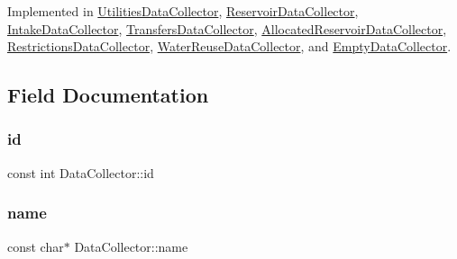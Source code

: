 Implemented in \mbox{\hyperlink{classUtilitiesDataCollector_ae502a096e8f4fdfdfd481ab2093f9771_ae502a096e8f4fdfdfd481ab2093f9771}{Utilities\+Data\+Collector}}, \mbox{\hyperlink{classReservoirDataCollector_ae2f8e808c5960608e510a64c7f00ad1b_ae2f8e808c5960608e510a64c7f00ad1b}{Reservoir\+Data\+Collector}}, \mbox{\hyperlink{classIntakeDataCollector_a2855eb8eed71649309bd4d9336f258c0_a2855eb8eed71649309bd4d9336f258c0}{Intake\+Data\+Collector}}, \mbox{\hyperlink{classTransfersDataCollector_ade6b896383f079d8973076e6b9a8053a_ade6b896383f079d8973076e6b9a8053a}{Transfers\+Data\+Collector}}, \mbox{\hyperlink{classAllocatedReservoirDataCollector_a30d8c59205862822f6548472ba62e537_a30d8c59205862822f6548472ba62e537}{Allocated\+Reservoir\+Data\+Collector}}, \mbox{\hyperlink{classRestrictionsDataCollector_afb3c49c2c9b152bb2372e2fcc198e1b8_afb3c49c2c9b152bb2372e2fcc198e1b8}{Restrictions\+Data\+Collector}}, \mbox{\hyperlink{classWaterReuseDataCollector_a8cead3771efabeb62dcf069008810f43_a8cead3771efabeb62dcf069008810f43}{Water\+Reuse\+Data\+Collector}}, and \mbox{\hyperlink{classEmptyDataCollector_aa71282121251d344d674223409445be9_aa71282121251d344d674223409445be9}{Empty\+Data\+Collector}}.



\subsection{Field Documentation}
\mbox{\label{classDataCollector_a5cb840b6fbcf6afe364eef9114984383_a5cb840b6fbcf6afe364eef9114984383}} 
\subsubsection{\texorpdfstring{id}{id}}
{\footnotesize\ttfamily const int Data\+Collector\+::id}

\mbox{\label{classDataCollector_a3a9a5033592f72ada429aa20056162b9_a3a9a5033592f72ada429aa20056162b9}} 
\subsubsection{\texorpdfstring{name}{name}}
{\footnotesize\ttfamily const char$\ast$ Data\+Collector\+::name}

